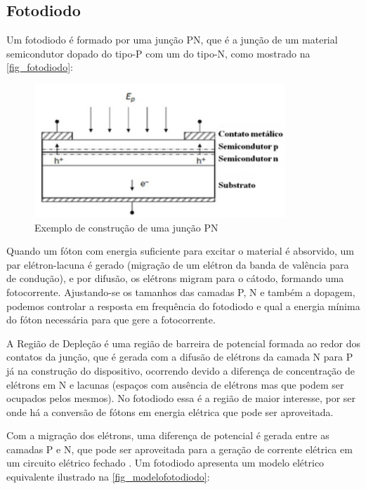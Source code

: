 \subsection{Fotodiodo}
\label{secao_fotodiodo}
Um fotodiodo \'e formado por uma junção PN, que \'e a junção de um material semicondutor dopado do tipo-P com um do tipo-N, como mostrado na \autoref{fig_fotodiodo}:

\begin{figure}[!h]
	\caption{\label{fig_fotodiodo}Exemplo de construção de uma junção PN}
	\begin{center}
	    \includegraphics[scale=0.7]{Imagens/JuncaoPN.png}
	\end{center}
\end{figure}

Quando um fóton com energia suficiente para excitar o material \'e absorvido, um par el\'etron-lacuna \'e gerado (migração de um el\'etron da banda de valência para de condução), e por difusão, os el\'etrons migram para o cátodo, formando uma fotocorrente. Ajustando-se os tamanhos das camadas P, N e também a dopagem, podemos controlar a resposta em frequência do fotodiodo e qual a energia mínima do fóton necessária para que gere a fotocorrente.

A Região de Depleção é uma região de barreira de potencial formada ao redor dos contatos da junção, que é gerada com a difusão de elétrons da camada N para P já na construção do dispositivo, ocorrendo devido a diferença de concentração de elétrons em N e lacunas (espaços com ausência de elétrons mas que podem ser ocupados pelos mesmos). No fotodiodo essa é a região de maior interesse, por ser onde há a conversão de fótons em energia elétrica que pode ser aproveitada.

Com a migração dos el\'etrons, uma diferença de potencial \'e gerada entre as camadas P e N, que pode ser aproveitada para a geração de corrente el\'etrica em um circuito el\'etrico fechado \cite{hamamatsu}.
Um fotodiodo apresenta um modelo el\'etrico equivalente ilustrado na \autoref{fig_modelofotodiodo}:

